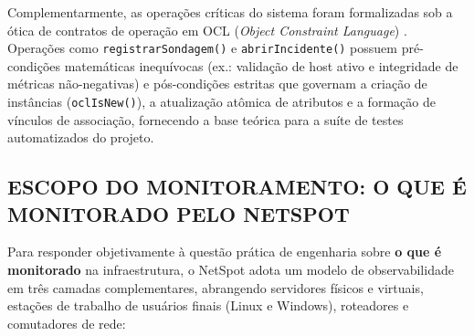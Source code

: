 \documentclass[12pt,a4paper]{article}
\begin{document}
Complementarmente, as operações críticas do sistema foram formalizadas sob a ótica de contratos de operação em OCL (\textit{Object Constraint Language}) \cite{wazlawick2011analise}. Operações como \texttt{registrarSondagem()} e \texttt{abrirIncidente()} possuem pré-condições matemáticas inequívocas (ex.: validação de host ativo e integridade de métricas não-negativas) e pós-condições estritas que governam a criação de instâncias (\texttt{oclIsNew()}), a atualização atômica de atributos e a formação de vínculos de associação, fornecendo a base teórica para a suíte de testes automatizados do projeto.

\subsection{ESCOPO DO MONITORAMENTO: O QUE É MONITORADO PELO NETSPOT}
Para responder objetivamente à questão prática de engenharia sobre \textbf{o que é monitorado} na infraestrutura, o NetSpot adota um modelo de observabilidade em três camadas complementares, abrangendo servidores físicos e virtuais, estações de trabalho de usuários finais (Linux e Windows), roteadores e comutadores de rede:
\end{document}
